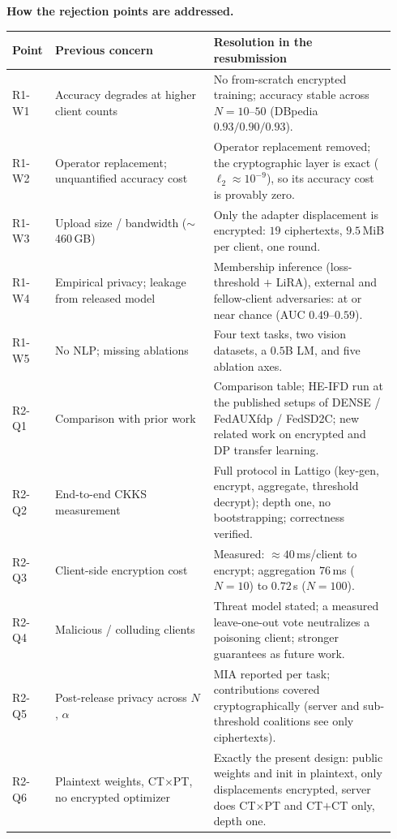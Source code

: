 \documentclass[10pt]{article}
\begin{document}
\textbf{How the rejection points are addressed.}

{\scriptsize
\renewcommand{\arraystretch}{0.96}
\setlength{\tabcolsep}{4pt}
\begin{tabular}{@{}p{0.085\linewidth}p{0.40\linewidth}p{0.46\linewidth}@{}}
\toprule
Point & Previous concern & Resolution in the resubmission \\
\midrule
R1-W1 & Accuracy degrades at higher client counts & No from-scratch encrypted training; accuracy stable across
$N\!=\!10$--$50$ (DBpedia $0.93/0.90/0.93$). \\
R1-W2 & Operator replacement; unquantified accuracy cost & Operator replacement removed; the cryptographic
layer is exact ($\ell_2\!\approx\!10^{-9}$), so its accuracy cost is provably zero. \\
R1-W3 & Upload size / bandwidth ($\sim$460\,GB) & Only the adapter displacement is encrypted: $19$
ciphertexts, $9.5$\,MiB per client, one round. \\
R1-W4 & Empirical privacy; leakage from released model & Membership inference (loss-threshold $+$ LiRA),
external and fellow-client adversaries: at or near chance (AUC $0.49$--$0.59$). \\
R1-W5 & No NLP; missing ablations & Four text tasks, two vision datasets, a $0.5$B LM, and five ablation axes.\\
\midrule
R2-Q1 & Comparison with prior work & Comparison table; HE-IFD run at the published setups of DENSE /
FedAUXfdp / FedSD2C; new related work on encrypted and DP transfer learning. \\
R2-Q2 & End-to-end CKKS measurement & Full protocol in Lattigo (key-gen, encrypt, aggregate, threshold
decrypt); depth one, no bootstrapping; correctness verified. \\
R2-Q3 & Client-side encryption cost & Measured: $\approx\!40$\,ms/client to encrypt; aggregation $76$\,ms
($N\!=\!10$) to $0.72$\,s ($N\!=\!100$). \\
R2-Q4 & Malicious / colluding clients & Threat model stated; a measured leave-one-out vote neutralizes a
poisoning client; stronger guarantees as future work. \\
R2-Q5 & Post-release privacy across $N$, $\alpha$ & MIA reported per task; contributions covered
cryptographically (server and sub-threshold coalitions see only ciphertexts). \\
R2-Q6 & Plaintext weights, CT$\times$PT, no encrypted optimizer & Exactly the present design: public weights
and init in plaintext, only displacements encrypted, server does CT$\times$PT and CT$+$CT only, depth one. \\

\end{tabular}}
\end{document}
